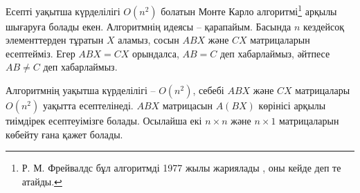 Есепті уақытша күрделілігі $O(n^2)$ болатын
Монте Карло алгоритмі\footnote{Р. М. Фрейвалдс бұл алгоритмді 1977 жылы
жариялады \cite{fre77}, оны кейде  деп те атайды.} 
арқылы шығаруға болады екен. Алгоритмнің идеясы -- қарапайым. 
Басында $n$ кездейсоқ элементтерден тұратын 
$X$ аламыз, сосын $ABX$ және $CX$ матрицаларын
есептейміз. Егер $ABX=CX$ орындалса, $AB=C$ деп
хабарлаймыз, әйтпесе $AB \neq C$ деп хабарлаймыз. 


Алгоритмнің уақытша күрделілігі -- $O(n^2)$, 
себебі $ABX$ және $CX$ матрицалары
$O(n^2)$ уақытта есептелінеді. $ABX$ матрицасын
$A(BX)$ көрінісі арқылы тиімдірек есептеуімізге болады.
Осылайша екі $n \times n$ және $n \times 1$
матрицаларын көбейту ғана қажет болады. 


